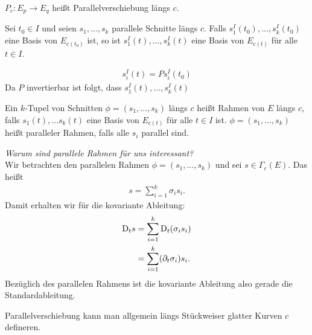 \begin{defs}[Parallelverschiebung]
$P_c : E_p \to E_q$ heißt Parallelverschiebung längs $c$.
\end{defs}
\begin{lem}
\label{lem:BasisVB}
Sei $t_0 \in I$ und seien $s_1, \dots, s_k$ parallele Schnitte längs $c$.
Falls $s^I_1 (t_0), \dots, s^I_k (t_0)$ eine Basis von $E_{c(t_0)}$ ist, so ist $s^I_1 (t), \dots, s^I_k (t)$ eine Basis von $E_{c(t)}$ für alle $t \in I$.
\end{lem}
\begin{bew}
\begin{align}
s^I_i (t) = Ps^I_i (t_0)
\end{align}
Da $P$ invertierbar ist folgt, dass $s^I_1 (t), \dots, s^I_k (t)$
\end{bew}
\begin{defs}
Ein $k$-Tupel von Schnitten $\phi = (s_1, \dots, s_k)$ längs $c$ heißt Rahmen von $E$ längs $c$, falls $s_1(t), \dots s_k(t)$ eine Basis von $E_{c(t)}$ für alle $t \in I$ ist.
$\phi = (s_1, \dots, s_k)$ heißt paralleler Rahmen, falls alle $s_i$ parallel sind.
\end{defs}
\textit{Warum sind parallele Rahmen für uns interessant?}\\
Wir betrachten den parallelen Rahmen $\phi = (s_1, \dots, s_k)$ und sei $s \in \Gamma_c (E)$.
Das heißt 
\begin{align}
s= \sum^{k}_{i=1} \sigma_i s_i.
\end{align}
Damit erhalten wir für die kovariante Ableitung:
\begin{align}
\mathrm{D}_t s &= \sum^{k}_{i=1} \mathrm{D}_t (\sigma_i s_i)\\
&= \sum^{k}_{i=1} (\partial_t \sigma_i) s_i. 
\end{align}
Bezüglich des parallelen Rahmens ist die kovariante Ableitung also gerade die Standardableitung.
\begin{bem}
Parallelverschiebung kann man allgemein längs Stückweiser glatter Kurven $c$ defineren.
\end{bem}


